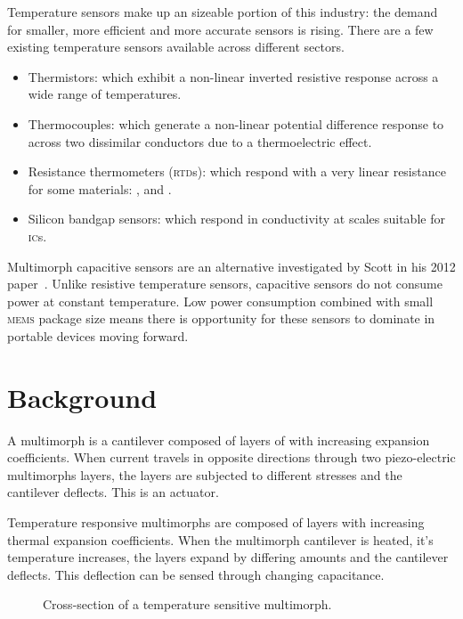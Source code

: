 \documentclass[a4paper,10pt,twocolumn]{article}
\newcommand{\ic}{\textsc{ic}\xspace}
\newcommand{\mems}{\textsc{mems}\xspace}
\newcommand{\rtd}{\textsc{rtd}\xspace}
\begin{document}
Temperature sensors make up an sizeable portion of this industry: the demand for
smaller, more efficient and more accurate sensors is rising. There are a few
existing temperature sensors available across different sectors.

\begin{itemize}
    \item Thermistors: which exhibit a non-linear inverted resistive response
    across a wide range of temperatures.
    \item Thermocouples: which generate a non-linear potential difference
    response to across two dissimilar conductors due to a thermoelectric effect.
    \item Resistance thermometers (\rtd{}s): which respond with a very linear
    resistance for some materials: ,  and .
    \item Silicon bandgap sensors: which respond in conductivity at scales
    suitable for \ic{}s.
\end{itemize}

Multimorph capacitive sensors are an alternative investigated by Scott in his
2012 paper~\cite{scott2012600}. Unlike resistive temperature sensors,
capacitive sensors do not consume power at constant temperature. Low power
consumption combined with small \mems package size means there is opportunity
for these sensors to dominate in portable devices moving forward.

\section{Background}

A multimorph is a cantilever composed of layers of with increasing expansion
coefficients. When current travels in opposite directions through
two piezo-electric multimorphs layers, the layers are subjected to different
stresses and the cantilever deflects. This is an actuator.

Temperature responsive multimorphs are composed of layers with increasing
thermal expansion coefficients. When the multimorph cantilever is heated, it's
temperature increases, the layers expand by differing amounts and the cantilever
deflects. This deflection can be sensed through changing capacitance.

\begin{figure}[h] \centering
    \caption{Cross-section of a temperature sensitive multimorph.}
    \label{fig:multimorph}
\end{figure}
\end{document}
